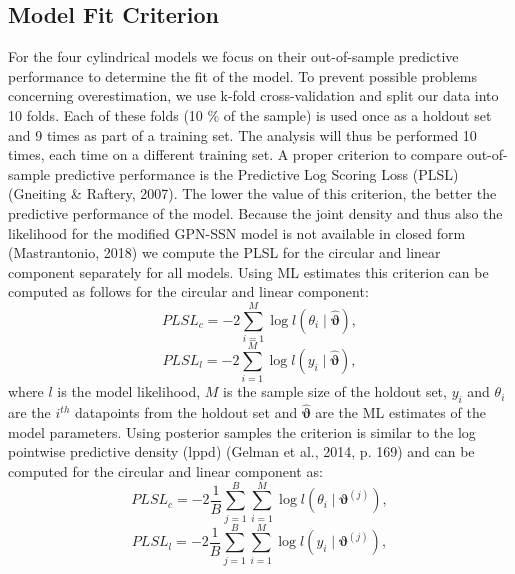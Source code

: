 \documentclass[man,mask]{apa6}
\begin{document}
\subsection{Model Fit Criterion}\label{Modelfit}

For the four cylindrical models we focus on their out-of-sample predictive
performance to determine the fit of the model. To prevent possible problems
concerning overestimation, we use k-fold cross-validation and split our data
into 10 folds. Each of these folds (10 \(\%\) of the sample) is used once as a
holdout set and 9 times as part of a training set. The analysis will thus be
performed 10 times, each time on a different training set.\newline
\indent A proper criterion to compare out-of-sample predictive performance is
the Predictive Log Scoring Loss (PLSL) (Gneiting \& Raftery, 2007). The lower the
value of this criterion, the better the predictive performance of the model.
Because the joint density and thus also the likelihood for the modified GPN-SSN
model is not available in closed form (Mastrantonio, 2018) we compute the
PLSL for the circular and linear component separately for all models. Using ML
estimates this criterion can be computed as follows for the circular and linear
component:
\begin{equation}\label{PLSLMLcirc}
PLSL_c = -2 \sum_{i = 1}^{M}\log l(\theta_i \mid \hat{\boldsymbol{\vartheta}}),\nonumber
\end{equation}
\begin{equation}\label{PLSLMLlin}
PLSL_l = -2 \sum_{i = 1}^{M}\log l(y_i \mid \hat{\boldsymbol{\vartheta}}),\nonumber
\end{equation}
\noindent where \(l\) is the model likelihood, \(M\) is the sample size of the
holdout set, \(y_i\) and \(\theta_i\) are the \(i^{th}\) datapoints from the
holdout set and \(\hat{\boldsymbol{\vartheta}}\) are the ML estimates of the
model parameters. Using posterior samples the criterion is similar to the log
pointwise predictive density (lppd) (Gelman et al., 2014, p. 169) and can be computed for the
circular and linear component as:
\begin{equation}\label{PLSLBayescirc}
PLSL_c = -2 \frac{1}{B} \sum_{j = 1}^{B}\sum_{i = 1}^{M} \log l(\theta_i \mid \boldsymbol{\vartheta}^{(j)}),\nonumber
\end{equation}
\begin{equation}\label{PLSLBayeslin}
PLSL_l = -2 \frac{1}{B} \sum_{j = 1}^{B}\sum_{i = 1}^{M} \log l(y_i \mid \boldsymbol{\vartheta}^{(j)}),\nonumber
\end{equation}
\end{document}

